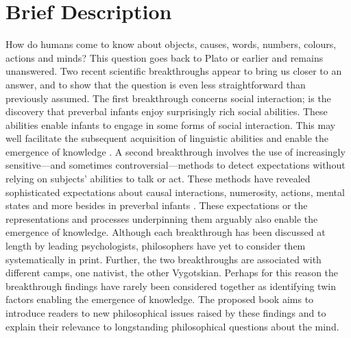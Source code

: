 \documentclass[12pt,\papersize]{extarticle}
\date{}
\begin{document}
\setlength\footnotesep{1em}





\maketitle

\setcounter{secnumdepth}{-1} 



\section{Brief Description}
How do humans come to know about %
objects,
causes,
words,
numbers,
colours,
actions
and
minds? 
This question goes back to Plato or earlier and remains unanswered.
Two recent scientific breakthroughs appear to bring us closer to an answer, and to show that the question is even less straightforward than previously  assumed.
The first breakthrough concerns social interaction;
is the discovery that preverbal infants enjoy surprisingly rich social abilities.
These abilities enable infants to engage in some forms of social interaction. 
This may well facilitate the subsequent acquisition of linguistic abilities and enable the emergence of knowledge \citep[e.g.][]{Csibra:2009xr,Meltzoff:2007pj,Tomasello:2005wx}. 
A second breakthrough involves the use of increasingly sensitive---and sometimes controversial---methods to detect  expectations without relying on subjects' abilities to talk or act.  
These methods have revealed sophisticated expectations about  causal interactions, numerosity, actions, mental states and more besides in preverbal infants \citep[e.g.][]{Spelke:1990jn,Baillargeon:gx}.
These expectations or the representations and processes underpinning them arguably also enable the emergence of knowledge. 
Although each breakthrough has been discussed at length by leading psychologists, philosophers have yet to consider them systematically in print.
Further, the two breakthroughs are associated with different camps, one nativist, the other Vygotskian.
Perhaps for this reason the breakthrough findings have rarely been considered together as identifying twin factors enabling the emergence of knowledge.
The proposed book aims to introduce readers to  
new philosophical issues raised by these findings  
and to explain their relevance to longstanding philosophical questions about the mind.  
\end{document}
